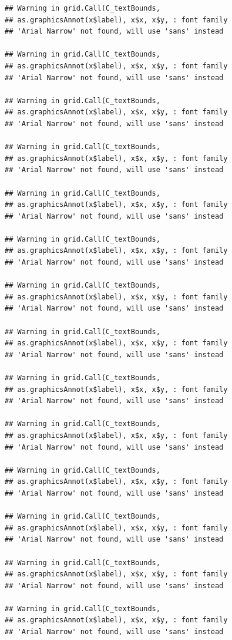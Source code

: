\documentclass[]{krantz}
\begin{document}
\begin{verbatim}
## Warning in grid.Call(C_textBounds,
## as.graphicsAnnot(x$label), x$x, x$y, : font family
## 'Arial Narrow' not found, will use 'sans' instead

## Warning in grid.Call(C_textBounds,
## as.graphicsAnnot(x$label), x$x, x$y, : font family
## 'Arial Narrow' not found, will use 'sans' instead

## Warning in grid.Call(C_textBounds,
## as.graphicsAnnot(x$label), x$x, x$y, : font family
## 'Arial Narrow' not found, will use 'sans' instead

## Warning in grid.Call(C_textBounds,
## as.graphicsAnnot(x$label), x$x, x$y, : font family
## 'Arial Narrow' not found, will use 'sans' instead

## Warning in grid.Call(C_textBounds,
## as.graphicsAnnot(x$label), x$x, x$y, : font family
## 'Arial Narrow' not found, will use 'sans' instead

## Warning in grid.Call(C_textBounds,
## as.graphicsAnnot(x$label), x$x, x$y, : font family
## 'Arial Narrow' not found, will use 'sans' instead

## Warning in grid.Call(C_textBounds,
## as.graphicsAnnot(x$label), x$x, x$y, : font family
## 'Arial Narrow' not found, will use 'sans' instead

## Warning in grid.Call(C_textBounds,
## as.graphicsAnnot(x$label), x$x, x$y, : font family
## 'Arial Narrow' not found, will use 'sans' instead

## Warning in grid.Call(C_textBounds,
## as.graphicsAnnot(x$label), x$x, x$y, : font family
## 'Arial Narrow' not found, will use 'sans' instead

## Warning in grid.Call(C_textBounds,
## as.graphicsAnnot(x$label), x$x, x$y, : font family
## 'Arial Narrow' not found, will use 'sans' instead

## Warning in grid.Call(C_textBounds,
## as.graphicsAnnot(x$label), x$x, x$y, : font family
## 'Arial Narrow' not found, will use 'sans' instead

## Warning in grid.Call(C_textBounds,
## as.graphicsAnnot(x$label), x$x, x$y, : font family
## 'Arial Narrow' not found, will use 'sans' instead

## Warning in grid.Call(C_textBounds,
## as.graphicsAnnot(x$label), x$x, x$y, : font family
## 'Arial Narrow' not found, will use 'sans' instead

## Warning in grid.Call(C_textBounds,
## as.graphicsAnnot(x$label), x$x, x$y, : font family
## 'Arial Narrow' not found, will use 'sans' instead
\end{verbatim}
\end{document}
